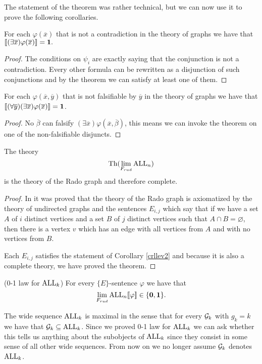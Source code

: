 The statement of the theorem was rather technical, but we can now use it to prove the following corollaries.

\begin{crll}For each $\varphi(\overline x)$ that is not a contradiction in the theory of graphs we have that $[\![(\exists \overline x)\varphi(\overline x)]\!]=\textbf{1}.$
\end{crll}
\begin{proof}
The conditions on $\psi_i$ are exactly saying that the conjunction is not a contradiction. Every other formula can be rewritten as a disjunction of such conjunctions and by the theorem we can satisfy at least one of them.
\end{proof}
\begin{crll}\label{crllev2}
For each $\varphi(\overline x,\overline y)$ that is not falsifiable by $\overline y$ in the theory of graphs we have that $[\![(\forall \overline y)(\exists \overline x)\varphi(\overline x)]\!]=\textbf{1}$.
\end{crll}
\begin{proof}
No $\overline \beta$ can falsify $(\exists \overline x)\varphi(\overline x,\overline \beta)$, this means we can invoke the theorem on one of the non-falsifiable disjuncts.
\end{proof}

\begin{thrm}\label{thrmall}
The theory \[\text{Th}(\lim_{F_{rud}}\text{ALL}_n)\] is the theory of the Rado graph and therefore complete.
\end{thrm}
\begin{proof}
In \cite{gaifman1964rado} it was proved that the theory of the Rado graph is axiomatized by the theory of undirected graphs and the sentences $E_{i,j}$ which say that if we have a set $A$ of $i$ distinct vertices and a set $B$ of $j$ distinct vertices such that $A\cap B=\varnothing$, then there is a vertex $v$ which has an edge with all vertices from $A$ and with no vertices from $B$.

Each $E_{i,j}$ satisfies the statement of Corollary \ref{crllev2} and because it is also a complete theory, we have proved the theorem.
\end{proof}

\begin{crll}(0-1 law for $\text{ALL}_k$)
For every $\{E\}$-sentence $\varphi$ we have that
\[\lim_{F_{rud}}\text{ALL}_n[\![\varphi]\!]\in\{\textbf{0},\textbf{1}\}.\]
\end{crll}


The wide sequence $\text{ALL}_k$ is maximal in the sense that for every $\mathcal{G}_k$ with $g_k=k$ we have that $\mathcal{G}_{k}\subseteq \text{ALL}_{k}$. Since we proved 0-1 law for $\text{ALL}_k$ we can ask whether this tells us anything about the subobjects of $\text{ALL}_k$ since they consist in some sense of all other wide sequences. From now on we no longer assume $\mathcal{G}_k$ denotes $\text{ALL}_k$.

